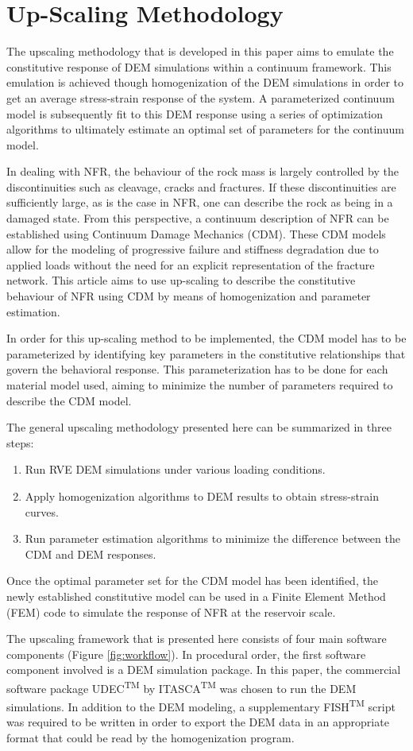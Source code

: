 \section{Up-Scaling Methodology}
The upscaling methodology that is developed in this paper aims to emulate the constitutive response of DEM simulations within a continuum framework. This emulation is achieved though homogenization of the DEM simulations in order to get an average stress-strain response of the system. A parameterized continuum model is subsequently fit to this DEM response using a series of optimization algorithms to ultimately estimate an optimal set of parameters for the continuum model.

In dealing with NFR, the behaviour of the rock mass is largely controlled by the discontinuities such as cleavage, cracks and fractures. If these discontinuities are sufficiently large, as is the case in NFR, one can describe the rock as being in a damaged state. From this perspective, a continuum description of NFR can be  established using Continuum Damage Mechanics (CDM). These CDM models allow for the modeling of progressive failure and stiffness degradation due to applied loads without the need for an explicit representation of the fracture network. This article aims to use up-scaling to describe the constitutive behaviour of NFR using CDM by means of homogenization and parameter estimation. 

In order for this  up-scaling method to be implemented, the CDM model has to be parameterized by identifying key parameters in the constitutive relationships that govern the behavioral response. This parameterization has to be done for each material model used, aiming to minimize the number of parameters required to describe the CDM model. 

The general upscaling methodology presented here can be summarized in three steps:
\begin{enumerate}
	\item Run RVE DEM simulations under various loading conditions.
	\item Apply homogenization algorithms to DEM results to obtain stress-strain curves.
	\item Run parameter estimation algorithms to minimize the difference between the CDM and DEM responses.
\end{enumerate}
Once the optimal parameter set for the CDM model has been identified, the newly established constitutive model can be used in a Finite Element Method (FEM) code to simulate the response of NFR at the reservoir scale.

The upscaling framework that is presented here consists of four main software components (Figure \ref{fig:workflow}). In procedural order, the first software component involved is a DEM simulation package. In this paper, the commercial software package UDEC\textsuperscript{TM} by ITASCA\textsuperscript{TM} was chosen to run the DEM simulations. In addition to the DEM modeling, a supplementary FISH\textsuperscript{TM} script was required to be written in order to export the DEM data in an appropriate format that could be read by the homogenization program. 

